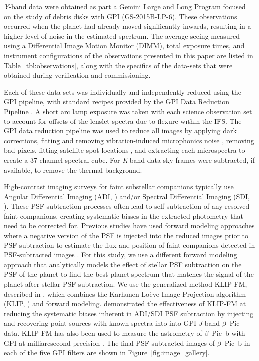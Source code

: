 \documentclass[twocolumn]{aastex6}
\begin{document}
{\it Y}-band data were obtained as part a Gemini Large and Long Program focused on the study of debris disks with GPI (GS-2015B-LP-6). These observations occurred when the planet had already moved significantly inwards, resulting in a higher level of noise in the estimated spectrum. The average seeing measured using a Differential Image Motion Monitor (DIMM), total exposure times, and instrument configurations of the observations presented in this paper are listed in Table~\ref{tbl:observations}, along with the specifics of the data-sets that were obtained during verification and commissioning.

Each of these data sets was individually and independently reduced using the GPI pipeline, with standard recipes provided by the GPI Data Reduction Pipeline \citep{Perrin2014}. A short arc lamp exposure was taken with each science observation set to account for offsets of the lenslet spectra due to flexure within the IFS. The GPI data reduction pipeline was used to reduce all images by applying dark corrections, fitting and removing vibration-induced microphonics noise \citep{Chilcote2012,Ingraham2014}, removing bad pixels, fitting satellite spot locations \citep{wang2014}, and extracting each microspectra to create a 37-channel spectral cube. For {\it K}-band data sky frames were subtracted, if available, to remove the thermal background.

High-contrast imaging surveys for faint substellar companions typically use Angular Differential Imaging (ADI, \citealp{Marois2006}) and/or Spectral Differential Imaging (SDI, \citealp{Sparks2002}). These PSF subtraction processes often lead to self-subtraction of any resolved faint companions, creating systematic biases in the extracted photometry that need to be corrected for. Previous studies have used forward modeling approaches where a negative version of the PSF is injected into the reduced images prior to PSF subtraction to estimate the flux and position of faint companions detected in PSF-subtracted images \citep[e.g.,][]{Hinkley2013,Oppenheimer2013,Crepp2015}. For this study, we use a different forward modeling approach that analytically models the effect of stellar PSF subtraction on the PSF of the planet to find the best planet spectrum that matches the signal of the planet after stellar PSF subtraction. We use the generalized method KLIP-FM, described in \citet{Pueyo2016}, which combines the Karhunen-Lo\`{e}ve Image Projection algorithm (KLIP, \citealt{Soummer2012}) and forward modeling. \citet{Pueyo2016} demonstrated the effectiveness of KLIP-FM at reducing the systematic biases inherent in ADI/SDI PSF subtraction by injecting and recovering point sources with known spectra into into GPI {\it J}-band $\beta$~Pic data. KLIP-FM has also been used to measure the astrometry of $\beta$~Pic~b with GPI at milliarcsecond precision \citep{wang2016}. The final PSF-subtracted images of $\beta$~Pic~b in each of the five GPI filters are shown in Figure~\ref{fig:image_gallery}.
\end{document}
